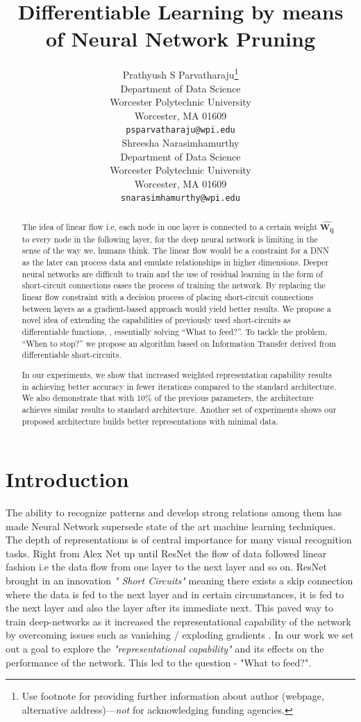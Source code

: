 \documentclass{article}
\title{Differentiable Learning by means of Neural Network Pruning}
\author{
  Prathyush S Parvatharaju\thanks{Use footnote for providing further
    information about author (webpage, alternative
    address)---\emph{not} for acknowledging funding agencies.} \\
  Department of Data Science\\
  Worcester Polytechnic University\\
  Worcester, MA 01609 \\
  \texttt{psparvatharaju@wpi.edu} \\
   \And
 Shreesha Narasimhamurthy \\
  Department of Data Science\\
  Worcester Polytechnic University\\
  Worcester, MA 01609 \\
  \texttt{snarasimhamurthy@wpi.edu} \\
}
\let\oldhat\hat
\renewcommand{\hat}[1]{\oldhat{\mathbf{#1}}}
\begin{document}
\maketitle

\begin{abstract}
The idea of linear flow i.e, each node in one layer is connected to a certain weight $\hat{W_{ij}}$ to every node in the following layer, for the deep neural network is limiting in the sense of the way we, humans think. The linear flow would be a constraint for a DNN as the later can process data and emulate relationships in higher dimensions. Deeper neural networks are difficult to train and the use of residual learning \cite{He2016DeepRL} in the form of short-circuit connections eases the process of training the network. By replacing the linear flow constraint with a decision process of placing short-circuit connections between layers as a gradient-based approach would yield better results. We propose a novel idea of extending the capabilities of previously used short-circuits as differentiable functions, \cite{Trask2018NeuralAL}, essentially solving “What to feed?”. To tackle the problem, “When to stop?” we propose an algorithm based on Information Transfer derived from differentiable short-circuits. 

In our experiments, we show that increased weighted representation capability results in achieving better accuracy in fewer iterations compared to the standard architecture. We also demonstrate that with 10\% of the previous parameters, the architecture achieves similar results to standard architecture. Another set of experiments shows our proposed architecture builds better representations with minimal data.
\end{abstract}




\section{Introduction}
The ability to recognize patterns and develop strong relations among them has made Neural Network supersede state of the art machine learning techniques. The depth of representations is of central importance for many visual recognition tasks. Right from Alex Net \cite{Krizhevsky2012ImageNetCW} up until ResNet \cite{He2016DeepRL} the flow of data followed linear fashion i.e the data flow from one layer to the next layer and so on. ResNet brought in an innovation \emph{" Short Circuits"} meaning there exists a skip connection where the data is fed to the next layer and in certain circumstances, it is fed to the next layer and also the layer after its immediate next. This paved way to train deep-networks as it increased the representational capability of the network by overcoming issues such as vanishing / exploding gradients \cite{Bengio1994LearningLD, Glorot2010UnderstandingTD}. In our work we set out a goal to explore the \emph{"representational capability"} and its effects on the performance of the network. This led to the question - "What to feed?".
\end{document}
